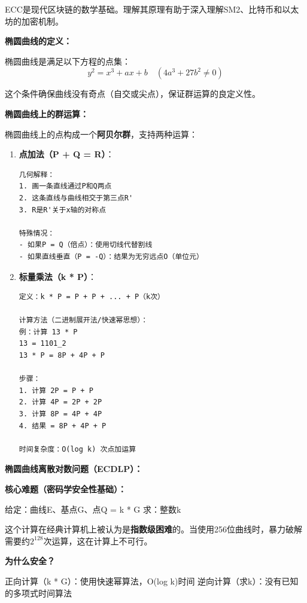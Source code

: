 ﻿\documentclass[12pt,a4paper]{article}
\begin{document}
ECC是现代区块链的数学基础。理解其原理有助于深入理解SM2、比特币和以太坊的加密机制。

\begin{theorybox}
\textbf{椭圆曲线的定义：}

椭圆曲线是满足以下方程的点集：
$$y^2 = x^3 + ax + b \quad (4a^3 + 27b^2 \neq 0)$$

这个条件确保曲线没有奇点（自交或尖点），保证群运算的良定义性。
\end{theorybox}

\textbf{椭圆曲线上的群运算：}

椭圆曲线上的点构成一个\textbf{阿贝尔群}，支持两种运算：

\begin{enumerate}[leftmargin=1.5em]
\item \textbf{点加法（P + Q = R）}：
\begin{lstlisting}
几何解释：
1. 画一条直线通过P和Q两点
2. 这条直线与曲线相交于第三点R'
3. R是R'关于x轴的对称点

特殊情况：
- 如果P = Q（倍点）：使用切线代替割线
- 如果直线垂直（P = -Q）：结果为无穷远点O（单位元）
\end{lstlisting}

\item \textbf{标量乘法（k * P）}：
\begin{lstlisting}
定义：k * P = P + P + ... + P（k次）

计算方法（二进制展开法/快速幂思想）：
例：计算 13 * P
13 = 1101_2
13 * P = 8P + 4P + P

步骤：
1. 计算 2P = P + P
2. 计算 4P = 2P + 2P
3. 计算 8P = 4P + 4P
4. 结果 = 8P + 4P + P

时间复杂度：O(log k) 次点加运算
\end{lstlisting}
\end{enumerate}

\textbf{椭圆曲线离散对数问题（ECDLP）：}

\begin{exambox}
\textbf{核心难题（密码学安全性基础）：}

给定：曲线E、基点G、点Q = k * G
求：整数k

这个计算在经典计算机上被认为是\textbf{指数级困难}的。当使用256位曲线时，暴力破解需要约$2^{128}$次运算，这在计算上不可行。

\textbf{为什么安全？}

正向计算（k * G）：使用快速幂算法，O(log k)时间
逆向计算（求k）：没有已知的多项式时间算法
\end{exambox}
\end{document}
